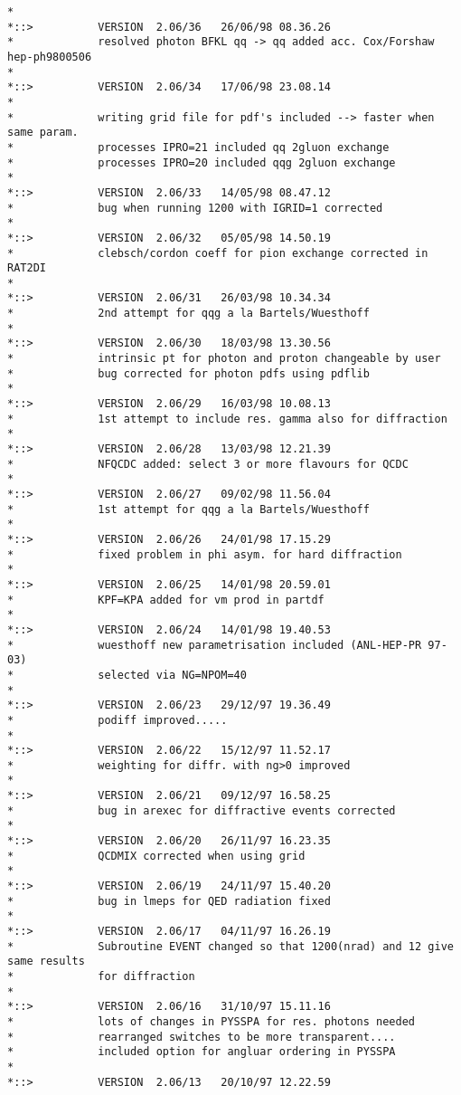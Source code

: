 \documentclass[10pt]{article} \usepackage{dina4}
\begin{document}
\begin{verbatim}
*
*::>          VERSION  2.06/36   26/06/98 08.36.26
*             resolved photon BFKL qq -> qq added acc. Cox/Forshaw hep-ph9800506
*
*::>          VERSION  2.06/34   17/06/98 23.08.14
*
*             writing grid file for pdf's included --> faster when same param.
*             processes IPRO=21 included qq 2gluon exchange
*             processes IPRO=20 included qqg 2gluon exchange
*
*::>          VERSION  2.06/33   14/05/98 08.47.12
*             bug when running 1200 with IGRID=1 corrected
*
*::>          VERSION  2.06/32   05/05/98 14.50.19
*             clebsch/cordon coeff for pion exchange corrected in RAT2DI
*
*::>          VERSION  2.06/31   26/03/98 10.34.34
*             2nd attempt for qqg a la Bartels/Wuesthoff
*
*::>          VERSION  2.06/30   18/03/98 13.30.56
*             intrinsic pt for photon and proton changeable by user
*             bug corrected for photon pdfs using pdflib
*
*::>          VERSION  2.06/29   16/03/98 10.08.13
*             1st attempt to include res. gamma also for diffraction
*
*::>          VERSION  2.06/28   13/03/98 12.21.39
*             NFQCDC added: select 3 or more flavours for QCDC
*
*::>          VERSION  2.06/27   09/02/98 11.56.04
*             1st attempt for qqg a la Bartels/Wuesthoff
*
*::>          VERSION  2.06/26   24/01/98 17.15.29
*             fixed problem in phi asym. for hard diffraction
*
*::>          VERSION  2.06/25   14/01/98 20.59.01
*             KPF=KPA added for vm prod in partdf
*
*::>          VERSION  2.06/24   14/01/98 19.40.53
*             wuesthoff new parametrisation included (ANL-HEP-PR 97-03)
*             selected via NG=NPOM=40
*
*::>          VERSION  2.06/23   29/12/97 19.36.49
*             podiff improved.....
*
*::>          VERSION  2.06/22   15/12/97 11.52.17
*             weighting for diffr. with ng>0 improved
*
*::>          VERSION  2.06/21   09/12/97 16.58.25
*             bug in arexec for diffractive events corrected
*
*::>          VERSION  2.06/20   26/11/97 16.23.35
*             QCDMIX corrected when using grid
*
*::>          VERSION  2.06/19   24/11/97 15.40.20
*             bug in lmeps for QED radiation fixed
*
*::>          VERSION  2.06/17   04/11/97 16.26.19
*             Subroutine EVENT changed so that 1200(nrad) and 12 give same results
*             for diffraction
*
*::>          VERSION  2.06/16   31/10/97 15.11.16
*             lots of changes in PYSSPA for res. photons needed
*             rearranged switches to be more transparent....
*             included option for angluar ordering in PYSSPA
*
*::>          VERSION  2.06/13   20/10/97 12.22.59

\end{verbatim}
\end{document}
